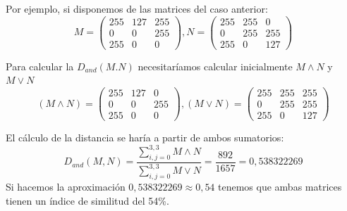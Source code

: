 Por ejemplo, si disponemos de las matrices del caso anterior:
\[ M=\left( \begin{array}{lcr}
	255 & 127 & 255 \\
	0 & 0 & 255 \\
	255 & 0 & 0 
\end{array} \right), N=\left( \begin{array}{lcr}
	255 & 255 & 0 \\
	0 & 255 & 255 \\
	255 & 0 & 127 
\end{array} \right) 
\]

Para calcular la $D_{and}(M.N)$ necesitaríamos calcular inicialmente $M \wedge N$ y $M \vee N$
\[ (M \wedge N)=\left( \begin{array}{lcr}
	255 & 127 & 0 \\
	0 & 0 & 255 \\
	255 & 0 & 0 
\end{array} \right), (M \vee N)=\left( \begin{array}{lcr}
	255 & 255 & 255 \\
	0 & 255 & 255 \\
	255 & 0 & 127 
\end{array} \right) 
\]

El cálculo de la distancia se haría a partir de ambos sumatorios:
\[D_{and}(M,N) = \frac 
	{\sum_{i,j=0}^{3,3} M \wedge N} 
	{\sum_{i,j=0}^{3,3} M \vee N} = \frac {892}{1657} = 0,538322269 
\]
Si hacemos la aproximación $ 0,538322269 \approx 0,54 $ tenemos que ambas matrices tienen un índice de similitud del 54\%.

